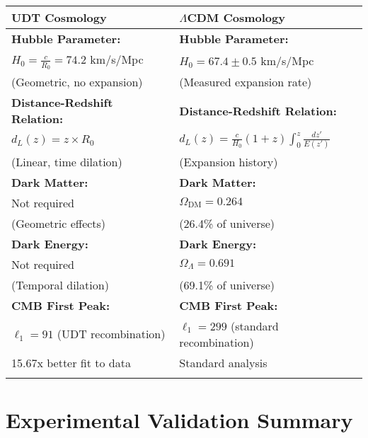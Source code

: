 \documentclass[11pt,a4paper]{article}
\begin{document}
\begin{center}
\begin{tabular}{|p{}|p{}|}
\hline
\textcolor{udtblue}{\textbf{UDT Cosmology}} & \textcolor{standardred}{\textbf{$\Lambda$CDM Cosmology}} \\
\hline
\vspace{0.3cm}
\textbf{Hubble Parameter:} & \textbf{Hubble Parameter:} \\
$H_0 = \frac{c}{R_0} = 74.2$ km/s/Mpc & $H_0 = 67.4 \pm 0.5$ km/s/Mpc \\
(Geometric, no expansion) & (Measured expansion rate) \\
\vspace{0.3cm}

\textbf{Distance-Redshift Relation:} & \textbf{Distance-Redshift Relation:} \\
$d_L(z) = z \times R_0$ & $d_L(z) = \frac{c}{H_0}(1+z)\int_0^z \frac{dz'}{E(z')}$ \\
(Linear, time dilation) & (Expansion history) \\
\vspace{0.3cm}

\textbf{Dark Matter:} & \textbf{Dark Matter:} \\
\textcolor{udtblue}{Not required} & \textcolor{standardred}{$\Omega_{\text{DM}} = 0.264$} \\
(Geometric effects) & (26.4\% of universe) \\
\vspace{0.3cm}

\textbf{Dark Energy:} & \textbf{Dark Energy:} \\
\textcolor{udtblue}{Not required} & \textcolor{standardred}{$\Omega_{\Lambda} = 0.691$} \\
(Temporal dilation) & (69.1\% of universe) \\
\vspace{0.3cm}

\textbf{CMB First Peak:} & \textbf{CMB First Peak:} \\
$\ell_1 = 91$ (UDT recombination) & $\ell_1 = 299$ (standard recombination) \\
\textcolor{udtblue}{15.67x better fit to data} & \textcolor{standardred}{Standard analysis} \\
\vspace{0.3cm}
\hline
\end{tabular}
\end{center}

\section{Experimental Validation Summary}
\end{document}
